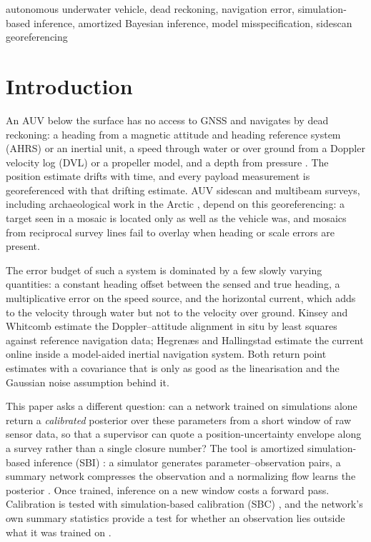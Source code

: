 \documentclass[conference]{IEEEtran}
\begin{document}
\begin{IEEEkeywords}
autonomous underwater vehicle, dead reckoning, navigation error, simulation-based inference, amortized Bayesian inference, model misspecification, sidescan georeferencing
\end{IEEEkeywords}

\section{Introduction}

An AUV below the surface has no access to GNSS and navigates by dead reckoning: a heading from a magnetic attitude and heading reference system (AHRS) or an inertial unit, a speed through water or over ground from a Doppler velocity log (DVL) or a propeller model, and a depth from pressure \cite{paull2014review}. The position estimate drifts with time, and every payload measurement is georeferenced with that drifting estimate. AUV sidescan and multibeam surveys, including archaeological work in the Arctic \cite{ludvigsen2016integrated,mogstad2020figaro}, depend on this georeferencing: a target seen in a mosaic is located only as well as the vehicle was, and mosaics from reciprocal survey lines fail to overlay when heading or scale errors are present.

The error budget of such a system is dominated by a few slowly varying quantities: a constant heading offset between the sensed and true heading, a multiplicative error on the speed source, and the horizontal current, which adds to the velocity through water but not to the velocity over ground. Kinsey and Whitcomb \cite{kinsey2007alignment} estimate the Doppler--attitude alignment in situ by least squares against reference navigation data; Hegren{\ae}s and Hallingstad \cite{hegrenaes2011modelaided} estimate the current online inside a model-aided inertial navigation system. Both return point estimates with a covariance that is only as good as the linearisation and the Gaussian noise assumption behind it.

This paper asks a different question: can a network trained on simulations alone return a \emph{calibrated} posterior over these parameters from a short window of raw sensor data, so that a supervisor can quote a position-uncertainty envelope along a survey rather than a single closure number? The tool is amortized simulation-based inference (SBI) \cite{cranmer2020frontier,greenberg2019apt}: a simulator generates parameter--observation pairs, a summary network compresses the observation and a normalizing flow learns the posterior \cite{radev2022bayesflow,radev2023joss}. Once trained, inference on a new window costs a forward pass. Calibration is tested with simulation-based calibration (SBC) \cite{talts2018sbc}, and the network's own summary statistics provide a test for whether an observation lies outside what it was trained on \cite{schmitt2023misspecification}.
\end{document}
